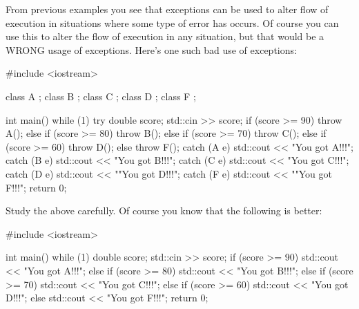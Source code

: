 \begin{ex}
\newpage{}

From previous examples you see that exceptions can be used to alter flow
of execution in situations where some type of error has occurs. Of
course you can use this to alter the flow of execution in any situation,
but that would be a WRONG usage of exceptions. Here's
one such bad use of exceptions:

\begin{console}
#include <iostream>

class A {};
class B {};
class C {};
class D {};
class F {};

int main()
{   
    while (1)
    {     
          try
          {
               double score;
               std::cin >> score;
               if (score >= 90)
               {
                    throw A();
               }
               else if (score >= 80)
               {
                    throw B();
               }
               else if (score >= 70)
               {
                    throw C();
               }
               else if (score >= 60)
               {
                    throw D();
               }
               else
               {
                    throw F();
               }
          }
          catch (A e)
          {
               std::cout << "You got A!!!\n";
          }
          catch (B e)
          {
               std::cout << "You got B!!!\n";
          }
          catch (C e)
          {
               std::cout << "You got C!!!\n";
          }
          catch (D e)
          {         
               std::cout << ""You got D!!!\n";
          }
          catch (F e)
          {
               std::cout << ""You got
               F!!!\n";
          }
    }
    return 0;
}
\end{console}

Study the above carefully. Of course you know that the following is
better:

\begin{console}
#include <iostream>

int main()
{   
    while (1)
    {
        double score;
        std::cin >> score;
        if (score >= 90)
        {   
           std::cout << "You got A!!!\n";
        }
        else if (score >= 80)
        {
           std::cout << "You got B!!!\n";
        }
        else if (score >= 70)
        {
           std::cout << "You got C!!!\n";
        }
        else if (score >= 60)
        {
           std::cout << "You got D!!!\n";
        }
        else
        {
           std::cout << "You got F!!!\n";
        }
    }
    return 0;
}
\end{console}


\end{ex}
